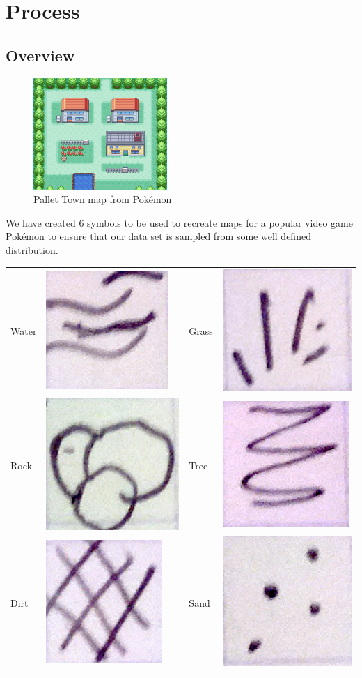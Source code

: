 \documentclass[preprint,3p,12pt]{elsarticle}
\begin{document}
\section{Process}
\label{process}

\subsection{Overview}
\label{process:overview}

\begin{figure}
\begin{center}
\includegraphics[width=2in]{PokemonPalletTown.png}
\end{center}
\caption{Pallet Town map from Pok\'{e}mon} 
\end{figure}


We have created 6 symbols to be used to recreate maps for a popular video game
Pok\'{e}mon to ensure that our data set is sampled from some well defined distribution.


\begin{tabular}{llll}
Water & \includegraphics[width=.5in]{water.png} &
Grass & \includegraphics[width=.5in]{grass.png} \\
Rock & \includegraphics[width=.5in]{rocks.png} &
Tree & \includegraphics[width=.5in]{tree.png} \\
Dirt & \includegraphics[width=.5in]{dirt.png} &
Sand & \includegraphics[width=.5in]{sand.png} \\
\end{tabular}
\end{document}
